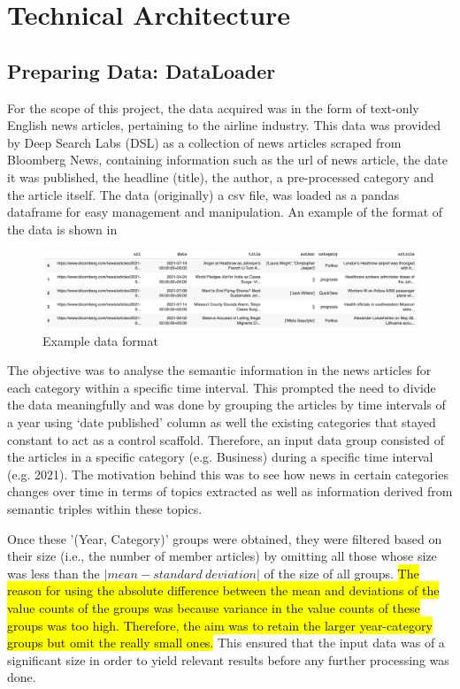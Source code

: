 \chapter{Technical Architecture}
\vspace*{-2ex}

\section{Preparing Data: DataLoader} \label{dataloader}

For the scope of this project, the data acquired was in the form of text-only English news articles, pertaining to the airline industry. This data was provided by Deep Search Labs (DSL) as a collection of news articles scraped from Bloomberg News, containing information such as the url of news article, the date it was published, the headline (title), the author, a pre-processed category and the article itself. The data (originally) a csv file, was loaded as a pandas dataframe for easy management and manipulation. An example of the format of the data is shown in~

\begin{figure}[H] 
\centering
\includegraphics[width=0.8\linewidth]{images/dataframe.png}
\caption{Example data format}
\label{dataframe}
\end{figure}

The objective was to analyse the semantic information in the news articles for each category within a specific time interval. This prompted the need to divide the data meaningfully and was done by grouping the articles by time intervals of a year using `date published' column as well the existing categories that stayed constant to act as a control scaffold. Therefore, an input data group consisted of the articles in a specific category (e.g. Business) during a specific time interval (e.g. 2021). The motivation behind this was to see how news in certain categories changes over time in terms of topics extracted as well as information derived from semantic triples within these topics.

Once these '(Year, Category)' groups were obtained, they were filtered based on their size (i.e., the number of member articles) by omitting all those whose size was less than the $| mean - standard \ deviation |$ of the size of all groups. \hl{The reason for using the absolute difference between the mean and deviations of the value counts of the groups was because variance in the value counts of these groups was too high. Therefore, the aim was to retain the larger year-category groups but omit the really small ones.} This ensured that the input data was of a significant size in order to yield relevant results before any further processing was done.  

